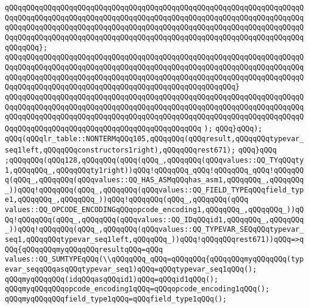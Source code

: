 \verb|qQQqqQQqqQQqqQQqqQQqqQQqqQQqqQQqqQQqqQQqqQQqqQQqqQQqqQQqqQQqqQQqqQQqqQQqqQQqqQQqqQQqqQQqqQQqqQQqqQQqqQQqqQQqqQQqqQQqqQQqqQQqqQQqqQQqqQQqqQQqqQQqqQQqqQQqqQQqqQQqqQQqqQQqqQQqqQQqqQQqqQQqqQQqqQQqqQQqqQQqqQQqqQQqqQQqqQQqqQQqqQQqqQQqqQQqqQQqqQQqqQQqqQQqqQQqqQQqqQQqqQQqqQQqqQQqqQQqqQQqqQQqqQQq};|\newline
\verb|qQQqqQQqqQQqqQQqqQQqqQQqqQQqqQQqqQQqqQQqqQQqqQQqqQQqqQQqqQQqqQQqqQQqqQQqqQQqqQQqqQQqqQQqqQQqqQQqqQQqqQQqqQQqqQQqqQQqqQQqqQQqqQQqqQQqqQQqqQQqqQQqqQQqqQQqqQQqqQQqqQQqqQQqqQQqqQQqqQQqqQQqqQQqqQQqqQQqqQQqqQQqqQQqqQQqqQQqqQQqqQQqqQQqqQQqqQQqqQQqqQQqqQQqqQQqqQQqqQQqqQQq}|\newline
\verb|qQQqqQQqqQQqqQQqqQQqqQQqqQQqqQQqqQQqqQQqqQQqqQQqqQQqqQQqqQQqqQQqqQQqqQQqqQQqqQQqqQQqqQQqqQQqqQQqqQQqqQQqqQQqqQQqqQQqqQQqqQQqqQQqqQQqqQQqqQQqqQQqqQQqqQQqqQQqqQQqqQQqqQQqqQQqqQQqqQQqqQQqqQQqqQQqqQQqqQQqqQQqqQQqqQQqqQQqqQQqqQQqqQQqqQQqqQQqqQQqqQQqqQQqqQQqqQQq|\newline
\verb|);|\newline
\verb|qQQq}qQQq);|\newline
\verb|qQQq(qQQqlr_table::NONTERMqQQq105,qQQqqQQq(qQQqresult,qQQqqQQqtypevar_seq1left,qQQqqQQqconstructors1right),qQQqqQQqrest671);|\newline
\verb|qQQq}qQQq|\newline
\verb|;qQQqqQQq(qQQq128,qQQqqQQq(qQQq(qQQq_,qQQqqQQq(qQQqvalues::QQ_TYqQQqty1,qQQqqQQq_,qQQqqQQqty1right))qQQq!qQQqqQQq_qQQq!qQQqqQQq_qQQq!qQQqqQQq(qQQq_,qQQqqQQq(qQQqvalues::QQ_HAS_ASMqQQqhas_asm1,qQQqqQQq_,qQQqqQQq_))qQQq!qQQqqQQq(qQQq_,qQQqqQQq(qQQqvalues::QQ_FIELD_TYPEqQQqfield_type1,qQQqqQQq_,qQQqqQQq_))qQQq!qQQqqQQq(qQQq_,qQQqqQQq(qQQq|\newline
\verb|values::QQ_OPCODE_ENCODINGqQQqopcode_encoding1,qQQqqQQq_,qQQqqQQq_))qQQq!qQQqqQQq(qQQq_,qQQqqQQq(qQQqvalues::QQ_IDqQQqid1,qQQqqQQq_,qQQqqQQq_))qQQq!qQQqqQQq(qQQq_,qQQqqQQq(qQQqvalues::QQ_TYPEVAR_SEQqQQqtypevar_seq1,qQQqqQQqtypevar_seq1left,qQQqqQQq_))qQQq!qQQqqQQqrest671))qQQq=>qQQq{qQQqqQQqmyqQQqqQQqresultqQQq=qQQq|\newline
\verb|values::QQ_SUMTYPEqQQq(\\qQQqqQQq_qQQq=qQQqqQQq{qQQqqQQqmyqQQqqQQq(typevar_seqqQQqasqQQqtypevar_seq1)qQQq=qQQqtypevar_seq1qQQq();|\newline
\verb|qQQqmyqQQqqQQq(idqQQqasqQQqid1)qQQq=qQQqid1qQQq();|\newline
\verb|qQQqmyqQQqqQQqopcode_encoding1qQQq=qQQqopcode_encoding1qQQq();|\newline
\verb|qQQqmyqQQqqQQqfield_type1qQQq=qQQqfield_type1qQQq();|\newline
